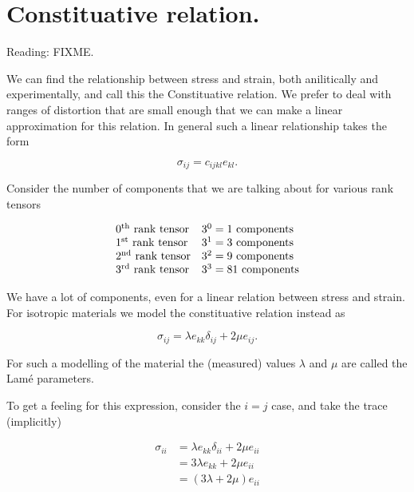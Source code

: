 \section{Constituative relation.}

Reading: FIXME.

We can find the relationship between stress and strain, both anilitically and experimentally, and call this the Constituative relation.  We prefer to deal with ranges of distortion that are small enough that we can make a linear approximation for this relation.  In general such a linear relationship takes the form

\begin{equation}\label{eqn:continuumL5:70}
\sigma_{ij} = c_{ijkl} e_{kl}.
\end{equation}

Consider the number of components that we are talking about for various rank tensors

\begin{equation}\label{eqn:continuumL5:90}
\begin{array}{l l}
\mbox{$0^\text{th}$ rank tensor} & \mbox{$3^0 = 1$ components} \\
\mbox{$1^\text{st}$ rank tensor} & \mbox{$3^1 = 3$ components} \\
\mbox{$2^\text{nd}$ rank tensor} & \mbox{$3^2 = 9$ components} \\
\mbox{$3^\text{rd}$ rank tensor} & \mbox{$3^3 = 81$ components} 
\end{array}
\end{equation}

We have a lot of components, even for a linear relation between stress and strain.  For isotropic materials we model the constituative relation instead as

\begin{equation}\label{eqn:continuumL5:110}
\sigma_{ij} = \lambda e_{kk} \delta_{ij} + 2 \mu e_{ij}.
\end{equation}

For such a modelling of the material the (measured) values $\lambda$ and $\mu$ are called the Lam\'e parameters.

To get a feeling for this expression, consider the $i = j$ case, and take the trace (implicitly)

\begin{align*}
\sigma_{ii} 
&= \lambda e_{kk} \delta_{ii} + 2 \mu e_{ii} \\
&= 3 \lambda e_{kk} + 2 \mu e_{ii} \\
&= (3 \lambda + 2 \mu) e_{ii} \\
\end{align*}

